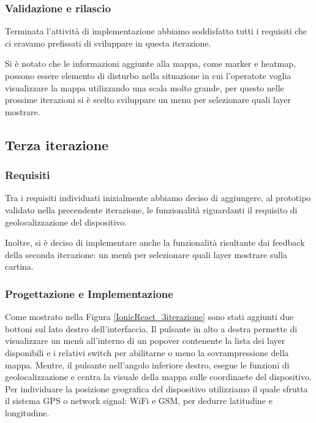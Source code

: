 \documentclass[a4paper]{report}
\begin{document}
\subsubsection*{{Validazione e rilascio}}
Terminata l'attività di implementazione abbiamo soddisfatto tutti i requisiti che ci eravamo prefissati di sviluppare in questa iterazione. 

Si è notato che le informazioni aggiunte alla mappa, come marker e heatmap, possono essere elemento di disturbo nella situazione in cui l'operatote voglia visualizzare la mappa utilizzando una scala molto grande, per questo nelle prossime iterazioni si è scelto sviluppare un menu per selezionare quali layer mostrare.

\subsection*{{Terza iterazione}}

\subsubsection*{{Requisiti}}
Tra i requisiti individuati inizialmente abbiamo deciso di aggiungere, al prototipo validato nella precendente iterazione, le funzionalità riguardanti il requisito di geolocalizzazione del dispositivo.

Inoltre, si è deciso di implementare anche la funzionalità risultante dai feedback della seconda iterazione: un menù per selezionare quali layer mostrare sulla cartina.

\subsubsection*{{Progettazione e Implementazione}}
Come mostrato nella Figura \ref{IonicReact_3iterazione} sono stati aggiunti due bottoni sul lato destro dell'interfaccia. Il pulsante in alto a destra permette di visualizzare un menù all'interno di un popover contenente la lista dei layer disponibili e i relativi switch per abilitarne o meno la sovrampressione della mappa. Mentre, il pulsante nell'angolo inferiore destro, esegue le funzioni di geolocalizzazione e centra la visuale della mappa sulle coordinaete del dispositivo.
Per individuare la posizione geografica del dispositivo utilizziamo \cite*{cordova-plugin-geolocation} il quale sfrutta il sistema GPS o network signal: WiFi e GSM, per dedurre latitudine e longitudine.
\end{document}
